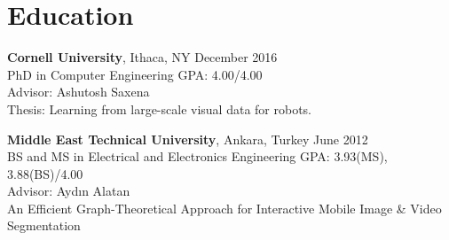     \section{\mysidestyle \textcolor{olgray}{Education}}
    \textbf{Cornell University}, Ithaca, NY \hfill  December 2016 \vspace{1mm}\\\vspace{0mm}%
    PhD in Computer Engineering \hfill GPA: 4.00/4.00   \vspace{0mm} \\%
    Advisor: Ashutosh Saxena \\%
    \hspace{-1mm} Thesis: 
    Learning from large-scale visual data for robots.

    \textbf{Middle East Technical University}, Ankara, Turkey  \hfill  June 2012 \vspace{1mm}\\\vspace{0mm}%
    BS and MS in Electrical and Electronics Engineering  \hfill GPA: 3.93(MS), 3.88(BS)/4.00 \vspace{0mm} \\\vspace{0mm}%
	  Advisor: Ayd\i n Alatan \hfill \vspace{0mm}\\\vspace{0mm}
	  \hspace{-1mm}An Efficient Graph-Theoretical Approach for Interactive Mobile Image \& Video Segmentation  \hfill \vspace{0mm}\\\vspace{-5mm} \\ %


